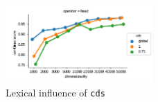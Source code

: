 \begin{figure}[b]
  \centering

  \includegraphics[width=0.5\textwidth]{supplement/figures/lexical-interaction-cds}

  \caption{Lexical influence of \texttt{cds}}
  \label{fig:lexical-cds}
\end{figure}
